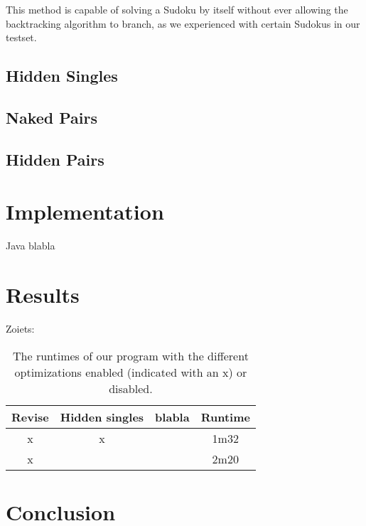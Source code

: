 \documentclass[11pt]{article} %
\begin{document}
This method is capable of solving a Sudoku by itself without ever allowing the backtracking algorithm to branch, as we experienced with certain Sudokus in our testset.

\subsection{Hidden Singles}

\subsection{Naked Pairs}

\subsection{Hidden Pairs}

\section{Implementation}

Java blabla

\section{Results}

Zoiets:

\begin{table}
\begin{center}
\begin{tabular}{c c c c}
\hline
 Revise & Hidden singles & blabla & Runtime \\
\hline
x & x &  & 1m32\\
x &  &  & 2m20  \\
\hline
\end{tabular}
\end{center}
\caption{The runtimes of our program with the different optimizations enabled (indicated with an x) or disabled.}
\end{table}

\section{Conclusion}
\end{document}

